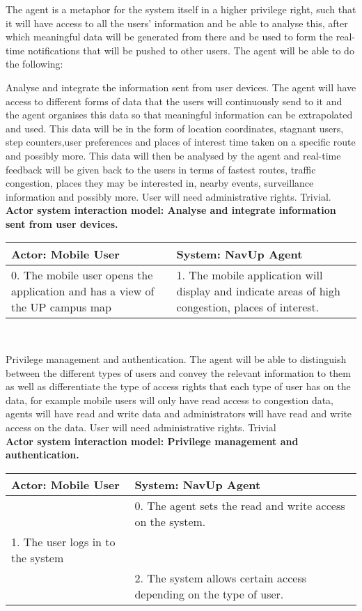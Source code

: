 The agent is a metaphor for the system itself in a higher privilege right, such that it will have access to all the users' information and be able to analyse this, after which meaningful data will be generated from there and be used to form the real-time notifications that will be pushed to other users. The agent will be able to do the following:
\\
\bigskip

\FuncReq
{Analyse and integrate the information sent from user devices.}
{The agent will have access to different forms of data that the users will continuously send to it and the agent organises this data so that meaningful information can be extrapolated and used. This data will be in the form of location coordinates, stagnant users, step counters,user preferences and places of interest time taken on a specific route and possibly more. This data will then be analysed by the agent and real-time feedback will be given back to the users in terms of fastest routes, traffic congestion, places they may be interested in, nearby events, surveillance information and possibly more.}
{User will need administrative rights.}
{Trivial.}
    \\
    \textbf{Actor system interaction model: Analyse and integrate information sent from user devices. }\\
    \begin{tabular}{ | p{6cm} | p{6cm} |}
    \hline
    Actor: Mobile User & System: NavUp Agent\\ \hline
     0. The mobile user opens the application and has a view of the UP campus map & 1. The mobile application will display and indicate areas of high congestion, places of interest.\\ \hline
    
    \end{tabular}
\\
\bigskip


\FuncReq
{Privilege management and authentication.}
{The agent will be able to distinguish between the different types of users and convey the relevant information to them as well as differentiate the type of access rights that each type of user has on the data, for example mobile users will only have read access to congestion data, agents will have read and write data and administrators will have read and write access on the data.}
{User will need administrative rights.}
{Trivial}
    \\
    \textbf{Actor system interaction model: Privilege management and authentication.}\\
    \begin{tabular}{ | p{6cm} | p{6cm} |}
    \hline
    Actor: Mobile User & System: NavUp Agent\\ \hline
    & 0. The agent sets the read and write access on the system.\\ \hline
    1. The user logs in to the system &\\ \hline
    & 2. The system allows certain access depending on the type of user.\\ \hline
    \end{tabular}
\\
\bigskip